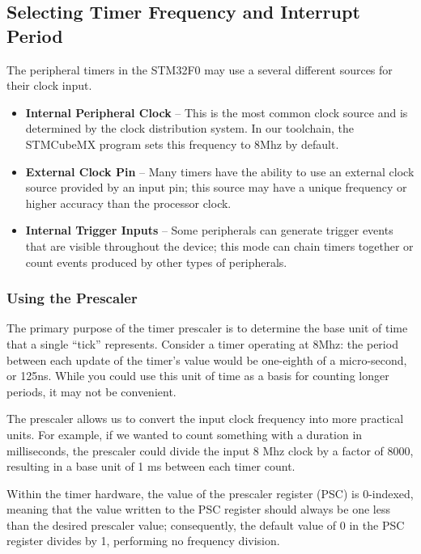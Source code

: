 \documentclass[openany,11pt,fleqn]{book} %
\begin{document}
    \subsection{\color{orange}Selecting Timer Frequency and Interrupt Period}	
    The peripheral timers in the STM32F0 may use a several different sources for their clock input. 
    \begin{itemize}
        \item\textbf{Internal Peripheral Clock} -- This is the most common clock source and is determined by the clock distribution system. In our toolchain, the STMCubeMX program sets this frequency to 8Mhz by default. 
        \item\textbf{External Clock Pin} -- Many timers have the ability to use an external clock source provided by an input pin; this source may have a unique frequency or higher accuracy than the processor clock.
        \item\textbf{Internal Trigger Inputs} -- Some peripherals can generate trigger events that are visible throughout the device; this mode can chain timers together or count events produced by other types of peripherals.
    \end{itemize}
 
 
    \subsubsection{Using the Prescaler}
      
        The primary purpose of the timer prescaler is to determine the base unit of time that a single ``tick'' represents. Consider a timer operating at 8Mhz: the period between each update of the timer's value would be one-eighth of a micro-second, or 125ns. While you could use this unit of time as a basis for counting longer periods, it may not be convenient. 
        
        The prescaler allows us to convert the input clock frequency into more practical units. For example, if we wanted to count something with a duration in milliseconds, the prescaler could divide the input 8 Mhz clock by a factor of 8000, resulting in a base unit of 1 ms between each timer count. 
        
        Within the timer hardware, the value of the prescaler register (PSC) is 0-indexed, meaning that the value written to the PSC register should always be one less than the desired prescaler value; consequently, the default value of 0 in the PSC register divides by 1, performing no frequency division.  
\end{document}
